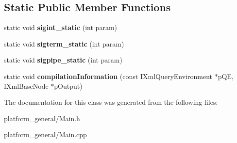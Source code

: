 \subsection*{\-Static \-Public \-Member \-Functions}
\begin{DoxyCompactItemize}
\item 
\hypertarget{classgeneral__server_1_1Main_a17d95a502be4543108199b26cffc4101}{static void {\bfseries sigint\-\_\-static} (int param)}\label{classgeneral__server_1_1Main_a17d95a502be4543108199b26cffc4101}

\item 
\hypertarget{classgeneral__server_1_1Main_afe112167a861db32b627d621517a2322}{static void {\bfseries sigterm\-\_\-static} (int param)}\label{classgeneral__server_1_1Main_afe112167a861db32b627d621517a2322}

\item 
\hypertarget{classgeneral__server_1_1Main_a37f4c8084f7b6e761f20978523a6fa9f}{static void {\bfseries sigpipe\-\_\-static} (int param)}\label{classgeneral__server_1_1Main_a37f4c8084f7b6e761f20978523a6fa9f}

\item 
\hypertarget{classgeneral__server_1_1Main_ab01dac4495b7bc3f898e09de7b84fc32}{static void {\bfseries compilation\-Information} (const \-I\-Xml\-Query\-Environment $\ast$p\-Q\-E, \-I\-Xml\-Base\-Node $\ast$p\-Output)}\label{classgeneral__server_1_1Main_ab01dac4495b7bc3f898e09de7b84fc32}

\end{DoxyCompactItemize}


\-The documentation for this class was generated from the following files\-:\begin{DoxyCompactItemize}
\item 
platform\-\_\-general/\-Main.\-h\item 
platform\-\_\-general/\-Main.\-cpp\end{DoxyCompactItemize}
